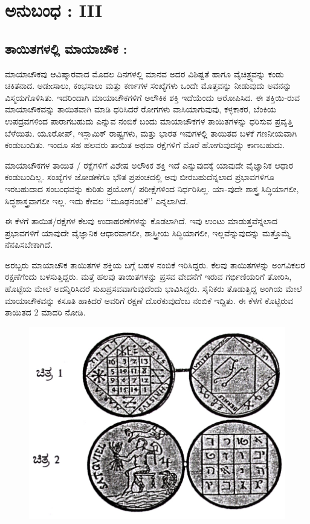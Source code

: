 
\chapter{ಅನುಬಂಧ : III}

\section*{ತಾಯಿತಗಳಲ್ಲಿ ಮಾಯಾಚೌಕ :}

ಮಾಯಾಚೌಕವು ಆವಿಷ್ಕಾರವಾದ ಮೊದಲ ದಿನಗಳಲ್ಲಿ ಮಾನವ ಅದರ ವಿಶಿಷ್ಟತೆ ಹಾಗೂ ವೈಚಿತ್ರ್ಯವನ್ನು ಕಂಡು ಚಕಿತನಾದ. ಅಡxಸಾಲು, ಕಂಭಸಾಲು ಮತ್ತು ಕರ್ಣಗಳ ಸಂಖ್ಯೆಗಳು ಒಂದೇ ಮೊತ್ತವನ್ನು ನೀಡುವುದು ಅವನನ್ನು ವಿಸ್ಮಯಗೊಳಿಸಿತು. ಇದರಿಂದಾಗಿ ಮಾಯಾಚೌಕಗಳಿಗೆ ಅಲೌಕಿಕ ಶಕ್ತಿ ಇದೆಯೆಂದು ಆರೋಪಿಸಿದ. ಈ ಶಕ್ತಿಯಿ-ರುವ ಮಾಯಾಚೌಕವನ್ನು ತಾಯಿತವಾಗಿ ಮಾಡಿ ಧರಿಸಿದರೆ ರೋಗಗಳು ವಾಸಿಯಾಗುವುವು, ಕಳ್ಳಕಾಕರ, ಬೆಂಕಿಯ ಉಪದ್ರವಗಳಿಂದ ಪಾರಾಗಬಹುದು ಎನ್ನುವ ನಂಬಿಕೆ ಬಂದು ಮಾಯಾಚೌಕಗಳ ತಾಯಿತಗಳನ್ನು ಧರಿಸುವ ಪ್ರವೃತ್ತಿ ಬೆಳೆಯಿತು. ಯೂರೋಪ್, ಇಸ್ಲಾಮಿಕ್ ರಾಷ್ಟ್ರಗಳು, ಮತ್ತು ಭಾರತ ಇವುಗಳಲ್ಲಿ ತಾಯಿತದ ಬಳಕೆ ಗಣನೀಯವಾಗಿ ಕಂಡುಬಂದಿತು. ಇಂದೂ ಸಹ ಹಲವರು ತಾಯಿತ ಅಥವಾ ರಕ್ಷೆಗಳಿಗೆ ಮೊರೆ ಹೋಗುವುದನ್ನು ಕಾಣಬಹುದು.

ಮಾಯಾಚೌಕಗಳ ತಾಯಿತ / ರಕ್ಷೆಗಳಿಗೆ ವಿಶೇಷ ಅಲೌಕಿಕ ಶಕ್ತಿ ಇದೆ ಎನ್ನುವುದಕ್ಕೆ ಯಾವುದೇ ವೈಜ್ಞಾನಿಕ ಆಧಾರ ಕಂಡುಬಂದಿಲ್ಲ. ಸಂಖ್ಯೆಗಳ ಜೋಡಣೆಗೂ ಭೌತ ಪ್ರಪಂಚದಲ್ಲಿ ಅವು ಬೀರಬಹುದೆನ್ನಲಾದ ಪ್ರಭಾವಗಳಿಗೂ ಇರಬಹುದಾದ ಸಂಬಂಧವನ್ನು ಕುರಿತು ಪ್ರಯೋಗ/ ಪರೀಕ್ಷೆಗಳಿಂದ ನಿರ್ಧರಿಸಿಲ್ಲ. ಯಾ-ವುದೇ ಶಾಸ್ತ್ರ ಸಿದ್ಧಿಯಾಗಲೀ, ಸಿದ್ಧಶಾಸ್ತ್ರವಾಗಲೀ ಇಲ್ಲ. ಇದು ಕೇವಲ ‘‘ಮೂಢನಂಬಿಕೆ’’ ಎನ್ನಲಾಗಿದೆ.

ಈ ಕೆಳಗೆ ತಾಯಿತ/ರಕ್ಷೆಗಳ ಕೆಲವು ಉದಾಹರಣೆಗಳನ್ನು ಕೊಡಲಾಗಿದೆ. ಇವು ಉಂಟು ಮಾಡುತ್ತವೆನ್ನಲಾದ ಪ್ರಭಾವಗಳಿಗೆ ಯಾವುದೇ ವೈಜ್ಞಾನಿಕ ಆಧಾರವಾಗಲೀ, ಶಾಸ್ತ್ರೀಯ ಸಿದ್ಧಿಯಾಗಲೀ, ಇಲ್ಲವೆನ್ನುವುದನ್ನು ಮತ್ತೊಮ್ಮೆ ನೆನಪಿಸಬೇಕಾಗಿದೆ.

ಅರಬ್ಬರು ಮಾಯಾಚೌಕ ತಾಯಿತಗಳ ಶಕ್ತಿಯ ಬಗ್ಗೆ ಬಹಳ ನಂಬಿಕೆ ಇರಿಸಿದ್ದರು. ಕೆಲವು ತಾಯಿತಗಳನ್ನು ಅಂಗವಿಕಲರ ರಕ್ಷಣೆಗೆಂದು ಬಳಸುತ್ತಿದ್ದರು. ಮತ್ತೆ ಹಲವು ತಾಯಿತಗಳನ್ನು ಪ್ರಸವ ವೇದನೆಗೆ ಇರುವ ಗರ್ಭಿಣಿಯರಿಗೆ ತೋರಿಸಿ, ಹೊಟ್ಟೆಯ ಮೇಲೆ ಅದನ್ನಿರಿಸಿದರೆ ಸುಖಪ್ರಸವವಾಗುವುದೆಂದು ಭಾವಿಸಿದ್ದರು. ಸೈನಿಕರು ತೊಡುತ್ತಿದ್ದ ಅಂಗಿಯ ಮೇಲೆ ಮಾಯಾಚೌಕವನ್ನು ಕಸೂತಿ ಹಾಕಿದರೆ ಅವರಿಗೆ ರಕ್ಷಣೆ ದೊರೆಕುವುದೆಂಬ ನಂಬಿಕೆ ಇದ್ದಿತು. ಈ ಕೆಳಗೆ ಕೊಟ್ಟಿರುವ ತಾಯಿತದ 2 ಮಾದರಿ ನೋಡಿ.
\begin{figure}[H]
\includegraphics{src/figures/chap11/fig11.1.jpg}
\end{figure}

